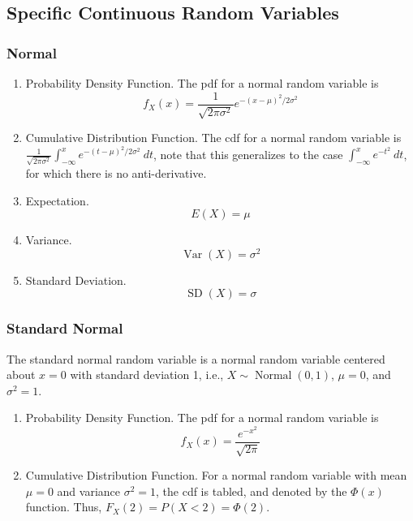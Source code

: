\documentclass{amsproc}
\DeclareMathOperator{\norm}{\text{Normal}}
\DeclareMathOperator{\Var}{\text{Var}}
\DeclareMathOperator{\SD}{\text{SD}}
\begin{document}
		\subsection{Specific Continuous Random Variables}
			\subsubsection{Normal}
			\begin{enumerate}
				\item Probability Density Function. The pdf for a normal random variable is \[f_{X}(x) = \frac{1}{\sqrt{2\pi\sigma^{2}}} e^{-(x-\mu)^{2}/2\sigma^{2}}\]

				\item Cumulative Distribution Function. The cdf for a normal random variable is $\frac{1}{\sqrt{2\pi\sigma^{2}}}\int_{-\infty}^{x} e^{-(t-\mu)^{2}/2\sigma^{2}} \ dt$, note that this generalizes to the case $\int_{-\infty}^{x} e^{-t^{2}} \ dt$, for which there is no anti-derivative.

				\item Expectation. \[E(X) = \mu\]

				\item Variance. \[\Var(X) = \sigma^{2}\]

				\item Standard Deviation. \[\SD(X) = \sigma\]
			\end{enumerate}

			\subsubsection{Standard Normal} The standard normal random variable is a normal random variable centered about $x=0$ with standard deviation 1, i.e., $X \sim \norm(0,1)$, $\mu = 0$, and $\sigma^{2} = 1$.
			\begin{enumerate}
				\item Probability Density Function. The pdf for a normal random variable is \[f_{X}(x) = \frac{e^{-x^{2}}}{\sqrt{2\pi}}\]

				\item Cumulative Distribution Function. For a normal random variable with mean $\mu = 0$ and variance $\sigma^{2} = 1$, the cdf is tabled, and denoted by the $\Phi(x)$ function. Thus, $F_{X}(2) = P(X < 2) = \Phi(2)$.
			\end{enumerate}
\end{document}

